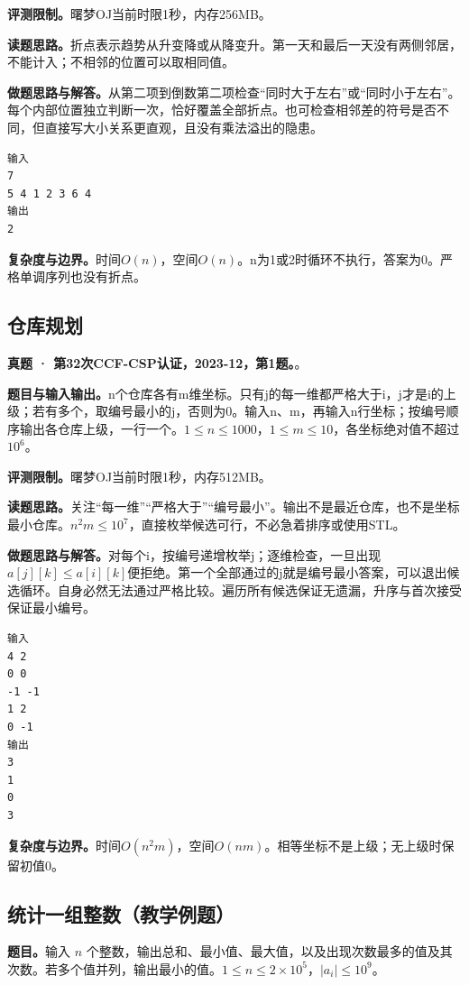 \noindent\textbf{评测限制。}曙梦OJ当前时限1秒，内存256MB。

\noindent\textbf{读题思路。}折点表示趋势从升变降或从降变升。第一天和最后一天没有两侧邻居，不能计入；不相邻的位置可以取相同值。

\noindent\textbf{做题思路与解答。}从第二项到倒数第二项检查“同时大于左右”或“同时小于左右”。每个内部位置独立判断一次，恰好覆盖全部折点。也可检查相邻差的符号是否不同，但直接写大小关系更直观，且没有乘法溢出的隐患。
\begin{verbatim}
输入
7
5 4 1 2 3 6 4
输出
2
\end{verbatim}

\noindent\textbf{复杂度与边界。}时间$O(n)$，空间$O(n)$。n为1或2时循环不执行，答案为0。严格单调序列也没有折点。
\subsection{仓库规划}
\textbf{真题 · 第32次CCF-CSP认证，2023-12，第1题。}。

\noindent\textbf{题目与输入输出。}n个仓库各有m维坐标。只有j的每一维都严格大于i，j才是i的上级；若有多个，取编号最小的j，否则为0。输入n、m，再输入n行坐标；按编号顺序输出各仓库上级，一行一个。$1\le n\le1000$，$1\le m\le10$，各坐标绝对值不超过$10^6$。

\noindent\textbf{评测限制。}曙梦OJ当前时限1秒，内存512MB。

\noindent\textbf{读题思路。}关注“每一维”“严格大于”“编号最小”。输出不是最近仓库，也不是坐标最小仓库。$n^2m\le10^7$，直接枚举候选可行，不必急着排序或使用STL。

\noindent\textbf{做题思路与解答。}对每个i，按编号递增枚举j；逐维检查，一旦出现$a[j][k]\le a[i][k]$便拒绝。第一个全部通过的j就是编号最小答案，可以退出候选循环。自身必然无法通过严格比较。遍历所有候选保证无遗漏，升序与首次接受保证最小编号。
\begin{verbatim}
输入
4 2
0 0
-1 -1
1 2
0 -1
输出
3
1
0
3
\end{verbatim}

\noindent\textbf{复杂度与边界。}时间$O(n^2m)$，空间$O(nm)$。相等坐标不是上级；无上级时保留初值0。
\subsection{统计一组整数（教学例题）}

\noindent\textbf{题目。}输入 $n$ 个整数，输出总和、最小值、最大值，以及出现次数最多的值及其次数。若多个值并列，输出最小的值。$1\le n\le2\times10^5$，$|a_i|\le10^9$。

